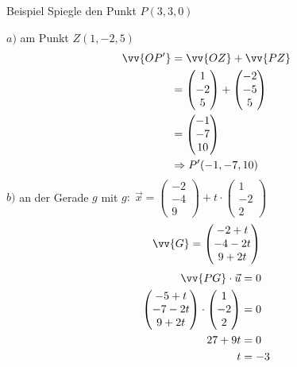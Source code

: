 \documentclass{article}
\begin{document}
\begin{boxx}[DarkBlue]{Beispiel}
    Spiegle den Punkt $P(3,3,0)$

    $a)$\hspace{3mm} am Punkt $Z(1,-2,5)$
    \begin{align*}
        \vv{OP'} &= \vv{OZ} + \vv{PZ} \\
        &= \begin{pmatrix}1\\-2\\5\end{pmatrix} + \begin{pmatrix}-2\\-5\\5\end{pmatrix} \\
        &= \begin{pmatrix}-1\\-7\\10\end{pmatrix}\\
        &\Rightarrow P'(-1,-7,10)
    \end{align*}
    $b)$\hspace{3mm} an der Gerade $g$ mit $g:\; \vec{x} = \begin{pmatrix}-2\\-4\\9\end{pmatrix} + t \cdot \begin{pmatrix}1\\-2\\2\end{pmatrix}$
        \[\vv{G} = \begin{pmatrix}-2+t\\-4-2t\\9+2t\end{pmatrix}\]
        \begin{align*}
            \vv{PG}\cdot \vec{u} &= 0 \\
            \begin{pmatrix}-5+t\\-7-2t\\9+2t\end{pmatrix} \cdot \begin{pmatrix}1\\-2\\2\end{pmatrix} &= 0 \\
            27 + 9t&=0 \\
            t &= -3 \\

\end{align*}
\end{boxx}
\end{document}
